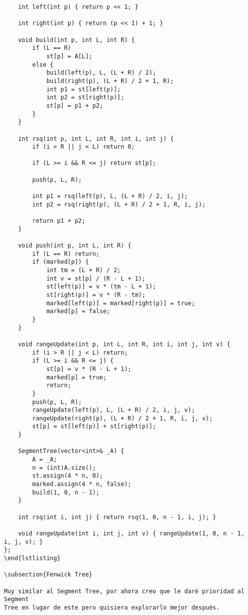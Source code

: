 \documentclass[11pt]{article}
\begin{document}
\begin{verbatim}
    int left(int p) { return p << 1; }

    int right(int p) { return (p << 1) + 1; }

    void build(int p, int L, int R) {
        if (L == R)
            st[p] = A[L];
        else {
            build(left(p), L, (L + R) / 2);
            build(right(p), (L + R) / 2 + 1, R);
            int p1 = st[left(p)];
            int p2 = st[right(p)];
            st[p] = p1 + p2;
        }
    }

    int rsq(int p, int L, int R, int i, int j) {
        if (i > R || j < L) return 0;

        if (L >= i && R <= j) return st[p];

        push(p, L, R);

        int p1 = rsq(left(p), L, (L + R) / 2, i, j);
        int p2 = rsq(right(p), (L + R) / 2 + 1, R, i, j);

        return p1 + p2;
    }

    void push(int p, int L, int R) {
        if (L == R) return;
        if (marked[p]) {
            int tm = (L + R) / 2;
            int v = st[p] / (R - L + 1);
            st[left(p)] = v * (tm - L + 1);
            st[right(p)] = v * (R - tm);
            marked[left(p)] = marked[right(p)] = true;
            marked[p] = false;
        }
    }

    void rangeUpdate(int p, int L, int R, int i, int j, int v) {
        if (i > R || j < L) return;
        if (L >= i && R <= j) {
            st[p] = v * (R - L + 1);
            marked[p] = true;
            return;
        }
        push(p, L, R);
        rangeUpdate(left(p), L, (L + R) / 2, i, j, v);
        rangeUpdate(right(p), (L + R) / 2 + 1, R, i, j, v);
        st[p] = st[left(p)] + st[right(p)];
    }

    SegmentTree(vector<int>& _A) {
        A = _A;
        n = (int)A.size();
        st.assign(4 * n, 0);
        marked.assign(4 * n, false);
        build(1, 0, n - 1);
    }

    int rsq(int i, int j) { return rsq(1, 0, n - 1, i, j); }

    void rangeUpdate(int i, int j, int v) { rangeUpdate(1, 0, n - 1, i, j, v); }
};
\end{lstlisting}

\subsection{Fenwick Tree}

Muy similar al Segment Tree, por ahora creo que le daré prioridad al Segment
Tree en lugar de este pero quisiera explorarlo mejor después.


\end{verbatim}
\end{document}
